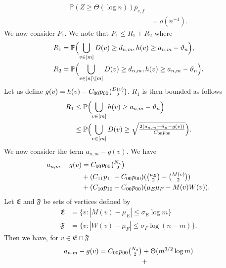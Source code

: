 \documentclass[10pt,journal,compsoc]{IEEEtran}
\theoremstyle{definition}
\begin{document}
\begin{IEEEproof}[Lemma~8]
\begin{IEEEproof}[Eq.~\eqref{eq:27}]
\begin{equation*}
\begin{split}
    \mathbb{P}(Z \geq \Theta(\log{n})) p_{e,f} \\ &= o(n^{-1}).
  \end{split}
\end{equation*}
We now consider $P_1$. We note that $P_1 \leq R_1 + R_2$
where
\begin{align*}
  R_1 &= \mathbb{P}\Bigl(\bigcup_{v \in [m]} D(v) \geq
  d_{n,m}, h(v) \geq a_{n,m} - \vartheta_n \Bigr), \\  
  R_2 &= \mathbb{P}\Bigl(\bigcup_{v \in [n] \setminus [m]} D(v) \geq
  d_{n,m}, h(v) \geq a_{n,m} - \vartheta_n \Bigr).
\end{align*}
Let us define $g(v) = h(v) - C_{00}p_{00} \tbinom{D(v)}{2}$.
$R_1$ is then bounded as follows
\begin{equation}
  \begin{split}
    \label{eq:36}
    R_1 &\leq \mathbb{P}\Bigl( \bigcup_{v \in [m]} h(v) \geq
    a_{n,m} - \vartheta_{n} \Bigr) \\
    &\leq \mathbb{P}\Bigl(\bigcup_{v \in [m]} D(v) \geq
      \sqrt{\tfrac{2 (a_{n,m} - \vartheta_n -
        g(v))}{C_{00} p_{00}}} \Bigr).
  \end{split}
\end{equation}
We now consider the term $a_{n,m} - g(v)$. We have
\begin{equation*}
  \begin{split}
  a_{n,m} - g(v) &= C_{00} p_{00} \tbinom{N_\kappa}{2} \\ &+ (C_{11}p_{11} -
  C_{00} p_{00})(\tbinom{\mu_E}{2} - \tbinom{M(v)}{2})
  \\ &+ (C_{10} p_{10} - C_{00} p_{00})(\mu_E\mu_F - M(v)W(v)).
  \end{split}
\end{equation*}
Let $\mathfrak{E}$ and $\mathfrak{F}$ be sets of vertices defined by
\begin{align}
\mathfrak{E} &=
\{v \colon |M(v) - \mu_E| \leq \sigma_E \log{m}\} \\ \mathfrak{F} &=
\{v \colon |W(v) - \mu_F| \leq \sigma_F \log{(n-m)}\}.
\end{align}
Then we have, for $v \in \mathfrak{E} \cap \mathfrak{F}$
\begin{equation}
  \label{eq:34}
  \begin{split}
  a_{n,m} - g(v) =  C_{00} p_{00} \tbinom{N_\kappa}{2} &+
  \Theta(m^{3/2} \log{m}) \\ &+ 

\end{split}
\end{equation}
\end{IEEEproof}
\end{IEEEproof}
\end{document}
